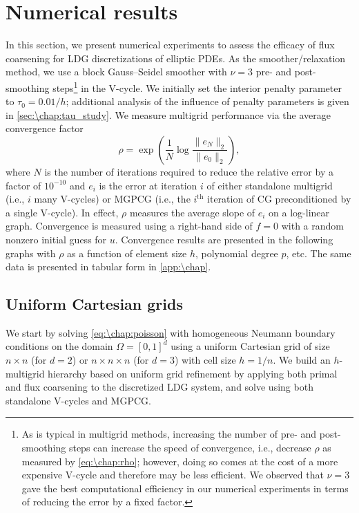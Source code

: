 \section{Numerical results}\label{sec:\chap:results}
In this section, we present numerical experiments to assess the efficacy of flux coarsening for LDG discretizations of elliptic PDEs. As the smoother/relaxation method, we use a block Gauss--Seidel smoother with $\nu = 3$ pre- and post-smoothing steps\footnote{As is typical in multigrid methods, increasing the number of pre- and post-smoothing steps can increase the speed of convergence, i.e., decrease $\rho$ as measured by \cref{eq:\chap:rho}; however, doing so comes at the cost of a more expensive V-cycle and therefore may be less efficient. We observed that $\nu = 3$ gave the best computational efficiency in our numerical experiments in terms of reducing the error by a fixed factor.} in the V-cycle. We initially set the interior penalty parameter to $\tau_0 = 0.01/h$; additional analysis of the influence of penalty parameters is given in \cref{sec:\chap:tau_study}. We measure multigrid performance via the average convergence factor
\begin{equation}\label{eq:\chap:rho}
\rho = \exp\left(\frac{1}{N} \log\frac{\|e_N\|_2}{\|e_0\|_2}\right),
\end{equation}
where $N$ is the number of iterations required to reduce the relative error by a factor of $10^{-10}$ and $e_i$ is the error at iteration $i$ of either standalone multigrid (i.e., $i$ many V-cycles) or MGPCG (i.e., the $i^\text{th}$ iteration of CG preconditioned by a single V-cycle). In effect, $\rho$ measures the average slope of $e_i$ on a log-linear graph. Convergence is measured using a right-hand side of $f=0$ with a random nonzero initial guess for $u$. Convergence results are presented in the following graphs with $\rho$ as a function of element size $h$, polynomial degree $p$, etc. The same data is presented in tabular form in \cref{app:\chap}.

\subsection{Uniform Cartesian grids}\label{sec:\chap:cartesian}
We start by solving \cref{eq:\chap:poisson} with homogeneous Neumann boundary conditions on the domain $\Omega = [0,1]^d$ using a uniform Cartesian grid of size $n \times n$ (for $d=2$) or $n \times n \times n$ (for $d=3$) with cell size $h = 1/n$. We build an $h$-multigrid hierarchy based on uniform grid refinement by applying both primal and flux coarsening to the discretized LDG system, and solve using both standalone V-cycles and MGPCG.

